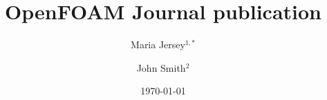 \documentclass[e-only,10pt,reqno]{ofj}
\newcommand{\OF}[0]{OpenFOAM\textsuperscript{\textregistered} }
\begin{document}


\title[\OF Journal publication]{\OF Journal publication}

\ifdefined\review
  \author{}
  \address{}
  \email{}
\else



\author{Maria Jersey$^{1,*}$}
\address{$^1$Address1}

\author{John Smith$^2$}
\address{$2$Address2} %

\fi






\date{\today}

\dedicatory{}


\maketitle

\ifdefined\review
  \linenumbers
\else
\fi




\end{document}
